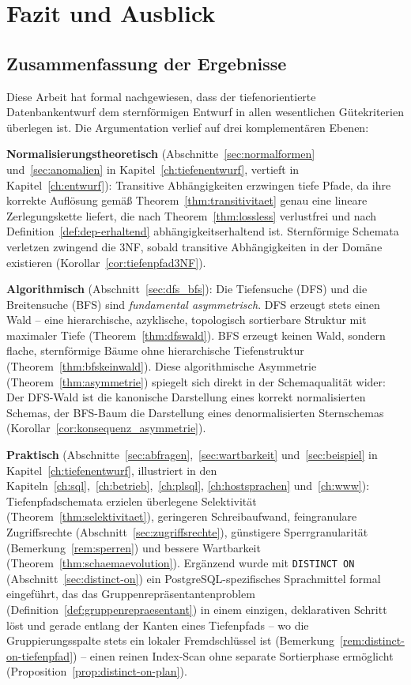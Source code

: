 ﻿\documentclass[a4paper,12pt]{report}
\theoremstyle{definition}
\theoremstyle{remark}
\begin{document}

\chapter{Fazit und Ausblick}
\label{ch:ausblick}

\section{Zusammenfassung der Ergebnisse}
\label{sec:fazit}

Diese Arbeit hat formal nachgewiesen, dass der tiefenorientierte
Datenbankentwurf dem sternförmigen Entwurf in allen wesentlichen
Gütekriterien überlegen ist. Die Argumentation verlief auf drei
komplementären Ebenen:

\textbf{Normalisierungstheoretisch} (Abschnitte~\ref{sec:normalformen}
und~\ref{sec:anomalien} in Kapitel~\ref{ch:tiefenentwurf}, vertieft in
Kapitel~\ref{ch:entwurf}): Transitive Abhängigkeiten erzwingen tiefe
Pfade, da ihre korrekte Auflösung gemäß
Theorem~\ref{thm:transitivitaet} genau eine lineare Zerlegungskette
liefert, die nach Theorem~\ref{thm:lossless} verlustfrei und nach
Definition~\ref{def:dep-erhaltend} abhängigkeitserhaltend ist.
Sternförmige Schemata verletzen zwingend die 3NF, sobald transitive
Abhängigkeiten in der Domäne existieren (Korollar~\ref{cor:tiefenpfad3NF}).

\textbf{Algorithmisch} (Abschnitt~\ref{sec:dfs_bfs}): Die Tiefensuche
(DFS) und die Breitensuche (BFS) sind \emph{fundamental asymmetrisch}.
DFS erzeugt stets einen Wald -- eine hierarchische, azyklische,
topologisch sortierbare Struktur mit maximaler Tiefe
(Theorem~\ref{thm:dfswald}). BFS erzeugt keinen Wald, sondern flache,
sternförmige Bäume ohne hierarchische Tiefenstruktur
(Theorem~\ref{thm:bfskeinwald}). Diese algorithmische Asymmetrie
(Theorem~\ref{thm:asymmetrie}) spiegelt sich direkt in der
Schemaqualität wider: Der DFS-Wald ist die kanonische Darstellung eines
korrekt normalisierten Schemas, der BFS-Baum die Darstellung eines
denormalisierten Sternschemas (Korollar~\ref{cor:konsequenz_asymmetrie}).

\textbf{Praktisch} (Abschnitte~\ref{sec:abfragen},~\ref{sec:wartbarkeit}
und~\ref{sec:beispiel} in Kapitel~\ref{ch:tiefenentwurf}, illustriert
in den Kapiteln~\ref{ch:sql},~\ref{ch:betrieb},~\ref{ch:plsql},
\ref{ch:hostsprachen} und~\ref{ch:www}): Tiefenpfadschemata erzielen
überlegene Selektivität (Theorem~\ref{thm:selektivitaet}), geringeren
Schreibaufwand, feingranulare Zugriffsrechte
(Abschnitt~\ref{sec:zugriffsrechte}), günstigere
Sperrgranularität (Bemerkung~\ref{rem:sperren}) und bessere
Wartbarkeit (Theorem~\ref{thm:schaemaevolution}). Ergänzend wurde mit
\texttt{DISTINCT ON} (Abschnitt~\ref{sec:distinct-on}) ein
PostgreSQL-spezifisches Sprachmittel formal eingeführt, das das
Gruppenrepräsentantenproblem (Definition~\ref{def:gruppenrepraesentant})
in einem einzigen, deklarativen Schritt löst und gerade entlang der
Kanten eines Tiefenpfads -- wo die Gruppierungsspalte stets ein
lokaler Fremdschlüssel ist (Bemerkung~\ref{rem:distinct-on-tiefenpfad})
-- einen reinen Index-Scan ohne separate Sortierphase ermöglicht
(Proposition~\ref{prop:distinct-on-plan}).
\end{document}
